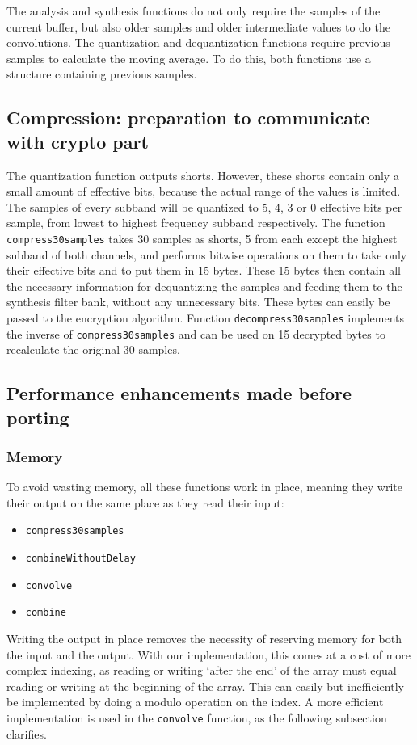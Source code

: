 \documentclass[a4paper]{article}
\begin{document}
The analysis and synthesis functions do not only require the samples of the current buffer, but also older samples and older intermediate values to do the convolutions. The quantization and dequantization functions require previous samples to calculate the moving average. To do this, both functions use a structure containing previous samples.

\subsection{Compression: preparation to communicate with crypto part}\label{sec:communication}
The quantization function outputs shorts. However, these shorts contain only a small amount of effective bits, because the actual range of the values is limited. The samples of every subband will be quantized to 5, 4, 3 or 0 effective bits per sample, from lowest to highest frequency subband respectively. The function \texttt{compress30samples} takes 30 samples as shorts, 5 from each except the highest subband of both channels, and performs bitwise operations on them to take only their effective bits and to put them in 15 bytes. These 15 bytes then contain all the necessary information for dequantizing the samples and feeding them to the synthesis filter bank, without any unnecessary bits. These bytes can easily be passed to the encryption algorithm. Function \texttt{decompress30samples} implements the inverse of \texttt{compress30samples} and can be used on 15 decrypted bytes to recalculate the original 30 samples.	


\subsection{Performance enhancements made before porting}\label{sec:performance}
\subsubsection{Memory}
To avoid wasting memory, all these functions work in place, meaning they write their output on the same place as they read their input:
\begin{itemize}[noitemsep]
\item \texttt{compress30samples}
\item \texttt{combineWithoutDelay}
\item \texttt{convolve}
\item \texttt{combine}
\end{itemize}
Writing the output in place removes the necessity of reserving memory for both the input and the output. With our implementation, this comes at a cost of more complex indexing, as reading or writing `after the end' of the array must equal reading or writing at the beginning of the array. This can easily but inefficiently be implemented by doing a modulo operation on the index. A more efficient implementation is used in the \texttt{convolve} function, as the following subsection clarifies.
\end{document}
